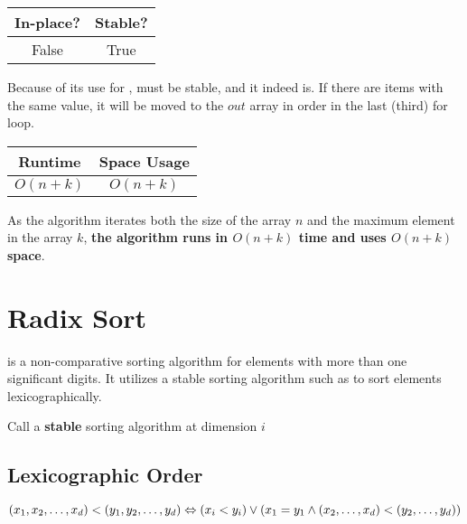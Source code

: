 \begin{center}
  \begin{tabular}{ | c | c | }
    \hline
    In-place? & Stable? \\
    \hline
    False & True \\
    \hline
  \end{tabular}
\end{center}

Because of its use for ,  must be stable, and it indeed is. If there are items with the same value, it will be moved to the $out$ array in order in the last (third) for loop.

\begin{center}
  \begin{tabular}{ | c | c | }
    \hline
    Runtime & Space Usage \\
    \hline
    $O(n + k)$ & $O(n + k)$ \\
    \hline
  \end{tabular}
\end{center}

As the algorithm iterates both the size of the array $n$ and the maximum element in the array $k$, \textbf{the algorithm runs in $O(n + k)$ time and uses $O(n + k)$ space}.

\section{Radix Sort}

 is a non-comparative sorting algorithm for elements with more than one significant digits. It utilizes a stable sorting algorithm such as  to sort elements lexicographically.

\noindent \hrulefill
\begin{algorithmic}[1]
   
      \State Call a \textbf{stable} sorting algorithm at dimension $i$
    \EndFor
    \State {}
  \EndFunction
\end{algorithmic}
\noindent \hrulefill

\subsection{Lexicographic Order}

\[
  (x_1, x_2, \ldots, x_d) < (y_1, y_2, \ldots, y_d) \\
  \Leftrightarrow \\
  (x_i < y_i) \lor (x_1 = y_1 \land (x_2, \ldots, x_d) < (y_2, \ldots, y_d))
\]

